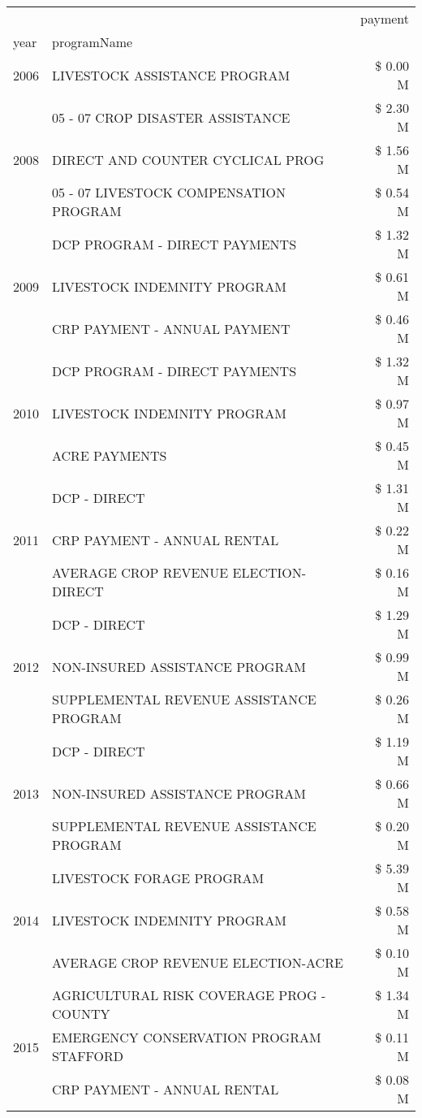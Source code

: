 \begin{tabular}{llr}
\toprule
 &  & payment \\
year & programName &  \\
\midrule
2006 & LIVESTOCK ASSISTANCE PROGRAM & \$ 0.00 M \\
\cline{1-3}
\multirow[t]{3}{*}{2008} & 05 - 07 CROP DISASTER ASSISTANCE & \$ 2.30 M \\
 & DIRECT AND COUNTER CYCLICAL PROG & \$ 1.56 M \\
 & 05 - 07 LIVESTOCK COMPENSATION PROGRAM & \$ 0.54 M \\
\cline{1-3}
\multirow[t]{3}{*}{2009} & DCP PROGRAM - DIRECT PAYMENTS & \$ 1.32 M \\
 & LIVESTOCK INDEMNITY PROGRAM & \$ 0.61 M \\
 & CRP PAYMENT - ANNUAL PAYMENT & \$ 0.46 M \\
\cline{1-3}
\multirow[t]{3}{*}{2010} & DCP PROGRAM - DIRECT PAYMENTS & \$ 1.32 M \\
 & LIVESTOCK INDEMNITY PROGRAM & \$ 0.97 M \\
 & ACRE PAYMENTS & \$ 0.45 M \\
\cline{1-3}
\multirow[t]{3}{*}{2011} & DCP - DIRECT & \$ 1.31 M \\
 & CRP PAYMENT - ANNUAL RENTAL & \$ 0.22 M \\
 & AVERAGE CROP REVENUE ELECTION-DIRECT & \$ 0.16 M \\
\cline{1-3}
\multirow[t]{3}{*}{2012} & DCP - DIRECT & \$ 1.29 M \\
 & NON-INSURED ASSISTANCE PROGRAM & \$ 0.99 M \\
 & SUPPLEMENTAL REVENUE ASSISTANCE PROGRAM & \$ 0.26 M \\
\cline{1-3}
\multirow[t]{3}{*}{2013} & DCP - DIRECT & \$ 1.19 M \\
 & NON-INSURED ASSISTANCE PROGRAM & \$ 0.66 M \\
 & SUPPLEMENTAL REVENUE ASSISTANCE PROGRAM & \$ 0.20 M \\
\cline{1-3}
\multirow[t]{3}{*}{2014} & LIVESTOCK FORAGE PROGRAM & \$ 5.39 M \\
 & LIVESTOCK INDEMNITY PROGRAM & \$ 0.58 M \\
 & AVERAGE CROP REVENUE ELECTION-ACRE & \$ 0.10 M \\
\cline{1-3}
\multirow[t]{3}{*}{2015} & AGRICULTURAL RISK COVERAGE PROG - COUNTY & \$ 1.34 M \\
 & EMERGENCY CONSERVATION PROGRAM STAFFORD & \$ 0.11 M \\
 & CRP PAYMENT - ANNUAL RENTAL & \$ 0.08 M \\

\end{tabular}
